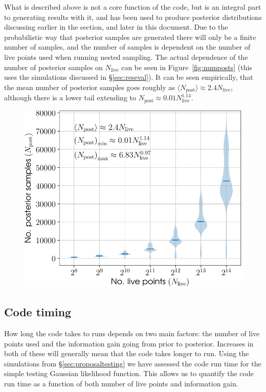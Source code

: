What is described above is not a core function of the \lppen code, but is an integral part to generating results with it, and has been used to
produce posterior distributions discussing earlier in the section, and later in this document. Due to the probabilistic
way that posterior samples are generated there will only be a finite number of samples, and the number of samples is dependent on the number
of live points used when running nested sampling. The actual dependence of the number of posterior samples on $N_{\text{live}}$ can be seen in
Figure~\ref{fig:numposts} (this uses the simulations discussed in \S\ref{sec:reseval}). It can be seen empirically, that the mean number of posterior
samples goes roughly as $\langle N_{\text{post}} \rangle \approx 2.4N_{\text{live}}$, although there is a lower tail extending to $N_{\text{post}} \approx
0.01N_{\text{live}}^{1.14}$.

\begin{figure}[!phtb]
\begin{center}
\includegraphics[width=1\columnwidth]{./figures/codeeval/stats/numposts/numposts}
\caption{ \protect}
\end{center}
\end{figure}

\subsection{Code timing}\label{sec:timing}

How long the code takes to runs depends on two main factors: the number of live points used and the information gain going from prior to posterior. Increases
in both of these will generally mean that the code takes longer to run. Using the simulations from \S\ref{sec:proposaltesting} we have assessed the code
run time for the simple testing Gaussian likelihood function. This allows us to quantify the code run time as a function of both number of live points and information
gain.

